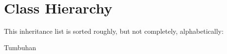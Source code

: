 \section{Class Hierarchy}
This inheritance list is sorted roughly, but not completely, alphabetically\+:\begin{DoxyCompactList}
\item {}
\begin{DoxyCompactList}
\item {}
\begin{DoxyCompactList}
\item {}
\begin{DoxyCompactList}
\item {}
\item {}
\end{DoxyCompactList}
\item {}
\begin{DoxyCompactList}
\item {}
\item {}
\end{DoxyCompactList}
\end{DoxyCompactList}
\item {}
\end{DoxyCompactList}
\item Tumbuhan\begin{DoxyCompactList}
\item {}
\item {}
\end{DoxyCompactList}
\end{DoxyCompactList}
